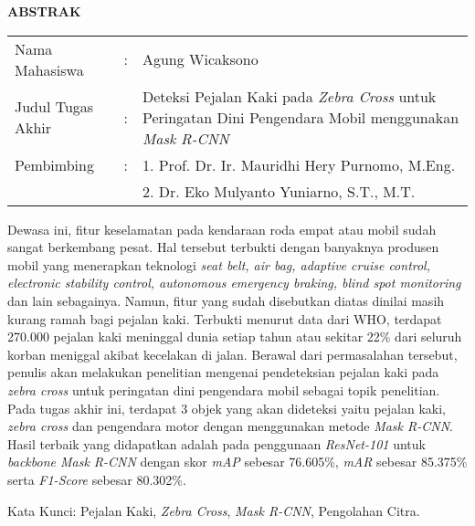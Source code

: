 \begin{center}
  \large\textbf{ABSTRAK}
\end{center}


\vspace{2ex}

\begingroup
  \setlength{\tabcolsep}{0pt}

  \noindent
  \begin{tabularx}{\textwidth}{l >{\centering}m{2em} X}
    Nama Mahasiswa    &:& Agung Wicaksono \\

    Judul Tugas Akhir &:&	Deteksi Pejalan Kaki pada \textit{Zebra Cross} untuk Peringatan Dini Pengendara Mobil menggunakan \textit{Mask R-CNN} \\

    Pembimbing        &:& 1. Prof. Dr. Ir. Mauridhi Hery Purnomo, M.Eng. \\
                      & & 2. Dr. Eko Mulyanto Yuniarno, S.T., M.T. \\
  \end{tabularx}
\endgroup

Dewasa ini, fitur keselamatan pada kendaraan roda empat atau mobil sudah sangat berkembang pesat. Hal tersebut terbukti dengan banyaknya produsen mobil yang menerapkan teknologi \textit{seat belt, air bag, adaptive cruise control, electronic stability control, autonomous emergency braking, blind spot monitoring} dan lain sebagainya. Namun, fitur yang sudah disebutkan diatas dinilai masih kurang ramah bagi pejalan kaki. Terbukti menurut data dari WHO, terdapat 270.000 pejalan kaki meninggal dunia setiap tahun atau sekitar 22\% dari seluruh korban meniggal akibat kecelakan di jalan. Berawal dari permasalahan tersebut, penulis akan melakukan penelitian mengenai pendeteksian pejalan kaki pada \textit{zebra cross} untuk peringatan dini pengendara mobil sebagai topik penelitian. Pada tugas akhir ini, terdapat 3 objek yang akan dideteksi yaitu pejalan kaki, \textit{zebra cross} dan pengendara motor dengan menggunakan metode \textit{Mask R-CNN}. Hasil terbaik yang didapatkan adalah pada penggunaan \textit{ResNet-101} untuk \textit{backbone Mask R-CNN} dengan skor \textit{mAP} sebesar 76.605\%, \textit{mAR} sebesar 85.375\% serta \textit{F1-Score} sebesar 80.302\%.

Kata Kunci: Pejalan Kaki, \emph{Zebra Cross}, \emph{Mask R-CNN}, Pengolahan Citra.

